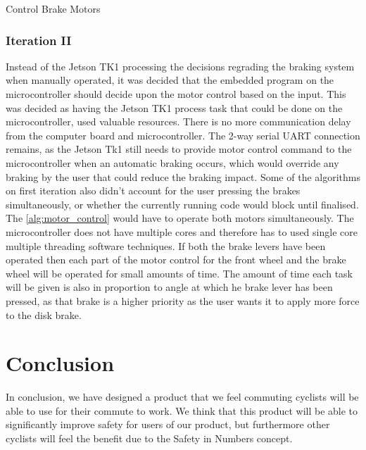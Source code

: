 \documentclass[a4paper]{report}
\begin{document}
{\begin{algorithm}[H]
\caption{Control Brake Motors}\label{alg:motor_control}
\begin{algorithmic}[1]

\Else
\EndIf

\Else
\EndIf
\EndFunction
\end{algorithmic}
\end{algorithm}

\subsection{Iteration II}
Instead of the Jetson TK1 processing the decisions regrading the braking system when manually operated, it was decided that the embedded program on the microcontroller should decide upon the motor control based on the input. This was decided as having the Jetson TK1 process task that could be done on the microcontroller, used valuable resources. There is no more communication delay from the computer board and microcontroller. The 2-way serial UART connection remains, as the Jetson Tk1 still needs to provide motor control command to the microcontroller when an automatic braking occurs, which would override any braking by the user that could reduce the braking impact. Some of the algorithms on first iteration also didn't account for the user pressing the brakes simultaneously, or whether the currently running code would block until finalised. The \ref{alg:motor_control} would have to operate both motors simultaneously. The microcontroller does not have multiple cores and therefore has to used single core multiple threading software techniques. If both the brake levers have been operated then each part of the motor control for the front wheel and the brake wheel will be operated for small amounts of time. The amount of time each task will be given is also in proportion to angle at which he brake lever has been pressed, as that brake is a higher priority as the user wants it to apply more force to the disk brake.

\chapter{Conclusion}
In conclusion, we have designed a product that we feel commuting cyclists will be able to use for their commute to work. We think that this product will be able to significantly improve safety for users of our product, but furthermore other cyclists will feel the benefit due to the Safety in Numbers concept.

}
\end{document}
